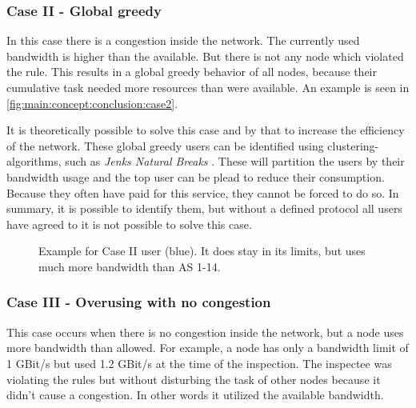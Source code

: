 \documentclass[thesis.tex]{subfiles}
\begin{document}
\subsubsection{Case II - Global greedy}
In this case there is a congestion inside the network. The currently used bandwidth is higher than the available. But there is not any node which violated the rule. This results in a global greedy behavior of all nodes, because their cumulative task needed more resources than were available. An example is seen in \autoref{fig:main:concept:conclusion:case2}.

It is theoretically possible to solve this case and by that to increase the efficiency of the network. These global greedy users can be identified using clustering-algorithms, such as \textit{Jenks Natural Breaks} \cite{Frenzel.1967}. These will partition the users by their bandwidth usage and the top user can be plead to reduce their consumption. Because they often have paid for this service, they cannot be forced to do so. In summary, it is possible to identify them, but without a defined protocol all users have agreed to it is not possible to solve this case.

\begin{figure}[!h]
	\centering
	\caption{Example for Case II user (blue). It does stay in its limits, but uses much more bandwidth than AS 1-14.}
	\label{fig:main:concept:conclusion:case2}
\end{figure}

\subsubsection{Case III - Overusing with no congestion}
This case occurs when there is no congestion inside the network, but a node uses more bandwidth than allowed. For example, a node has only a bandwidth limit of 1 GBit/s but used 1.2 GBit/s at the time of the inspection. The inspectee was violating the rules but without disturbing the task of other nodes because it didn't cause a congestion. In other words it utilized the available bandwidth.
\end{document}
